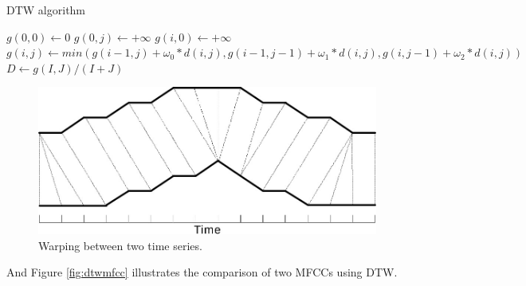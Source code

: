 \documentclass[%
  article,%
  10pt,%
  a4paper,%
  fleqn,%
  oneside,%
  sumario = tradicional,%
  chapter = TITLE,%
  section = TITLE,%
]{abntex2}
\begin{document}
\begin{algorithm}
  \caption{DTW algorithm}\label{euclid}
  \begin{algorithmic}
    \State $g(0, 0) \gets 0$
    \State $g(0, j) \gets +\infty$
    \EndFor
    \State $g(i, 0) \gets +\infty$
    \State $g(i, j) \gets min(g(i - 1, j) + \omega_{0} * d(i, j), g(i - 1, j - 1) + \omega_{1} * d(i, j), g(i, j - 1) + \omega_{2} * d(i, j))$
    \EndFor
    \EndFor
    \State $D \gets g(I, J) / (I + J)$
  \end{algorithmic}
\end{algorithm}
\begin{figure}[H]
  \centering
   \includegraphics[width = 0.5\columnwidth]{./Figuras/dtw_1}
  \caption[Warping between two time series]{Warping between two time series\footnotemark.}
  \label{fig:dtw_1}
\end{figure}

And Figure \ref{fig:dtwmfcc} illustrates the comparison of two MFCCs using DTW.
\end{document}

